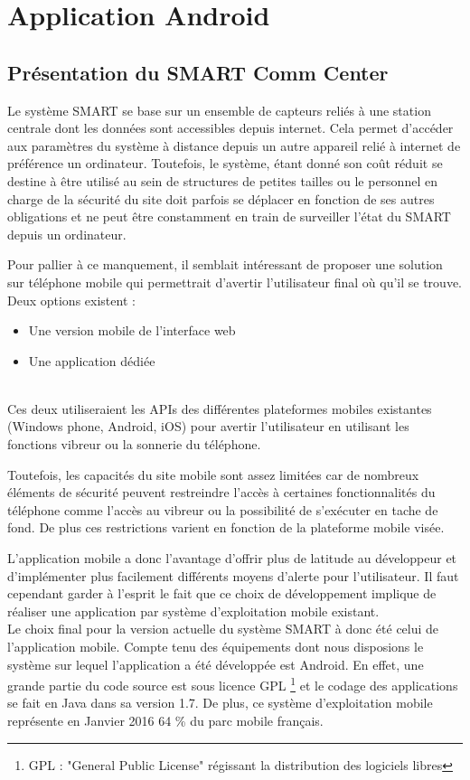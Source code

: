 



\chapter{Application Android}

\section{Présentation du SMART Comm Center}

	Le système SMART se base sur un ensemble de capteurs reliés à une station centrale dont les données sont accessibles depuis internet. Cela permet d'accéder aux paramètres du système à distance depuis un autre appareil relié à internet de préférence un ordinateur. Toutefois, le système, étant donné son coût réduit se destine à être utilisé au sein de structures de petites tailles ou le personnel en charge de la sécurité du site doit parfois se déplacer en fonction de ses autres obligations et ne peut être constamment en train de surveiller l'état du SMART depuis un ordinateur. 
	
	Pour pallier à ce manquement, il semblait intéressant de proposer une solution sur téléphone mobile qui permettrait d'avertir l'utilisateur final où qu'il se trouve. Deux options existent :
	~\\
	\begin{itemize}
	
	\item Une version mobile de l'interface web
	\item Une application dédiée	
		
	\end{itemize}
	~\\
	 Ces deux utiliseraient les APIs des différentes plateformes mobiles existantes (Windows phone, Android, iOS) pour avertir l'utilisateur en utilisant les fonctions vibreur ou la sonnerie du téléphone.

	 Toutefois, les capacités du site mobile sont assez limitées car de nombreux éléments de sécurité peuvent restreindre l'accès à certaines fonctionnalités du téléphone comme l'accès au vibreur ou la possibilité de s'exécuter en tache de fond. De plus ces restrictions varient en fonction de la plateforme mobile visée.

	
	 L'application mobile a donc l'avantage d'offrir plus de latitude au développeur et d'implémenter plus facilement différents moyens d'alerte pour l'utilisateur. Il faut cependant garder à l'esprit le fait que ce choix de développement implique de réaliser une application par système d'exploitation mobile existant.
	~\\
	Le choix final pour la version actuelle du système SMART à donc été celui de l'application mobile. Compte tenu des équipements dont nous disposions le système sur lequel l'application a été développée est Android. En effet, une grande partie du code source est sous licence GPL \footnote{GPL : "General Public License" régissant la distribution des logiciels libres} et le codage des applications se fait en Java dans sa version 1.7. De plus, ce système d'exploitation mobile représente en Janvier 2016 64 \% du parc mobile français.

